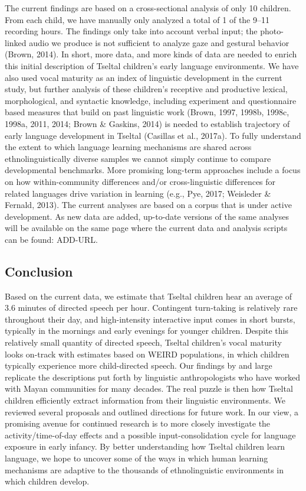 \documentclass[floatsintext,man]{apa6}
\theoremstyle{definition}
\theoremstyle{definition}
\theoremstyle{definition}
\theoremstyle{remark}
\begin{document}
The current findings are based on a cross-sectional analysis of only 10
children. From each child, we have manually only analyzed a total of 1
of the 9--11 recording hours. The findings only take into account verbal
input; the photo-linked audio we produce is not sufficient to analyze
gaze and gestural behavior (Brown, 2014). In short, more data, and more
kinds of data are needed to enrich this initial description of Tseltal
children's early language environments. We have also used vocal maturity
as an index of linguistic development in the current study, but further
analysis of these children's receptive and productive lexical,
morphological, and syntactic knowledge, including experiment and
questionnaire based measures that build on past linguistic work (Brown,
1997, 1998b, 1998c, 1998a, 2011, 2014; Brown \& Gaskins, 2014) is needed
to establish trajectory of early language development in Tseltal
(Casillas et al., 2017a). To fully understand the extent to which
language learning mechanisms are shared across ethnolinguistically
diverse samples we cannot simply continue to compare developmental
benchmarks. More promising long-term approaches include a focus on how
within-community differences and/or cross-linguistic differences for
related languages drive variation in learning (e.g., Pye, 2017;
Weisleder \& Fernald, 2013). The current analyses are based on a corpus
that is under active development. As new data are added, up-to-date
versions of the same analyses will be available on the same page where
the current data and analysis scripts can be found: ADD-URL.

\subsection{Conclusion}\label{disc-conclusion}

Based on the current data, we estimate that Tseltal children hear an
average of 3.6 minutes of directed speech per hour. Contingent
turn-taking is relatively rare throughout their day, and high-intensity
interactive input comes in short bursts, typically in the mornings and
early evenings for younger children. Despite this relatively small
quantity of directed speech, Tseltal children's vocal maturity looks
on-track with estimates based on WEIRD populations, in which children
typically experience more child-directed speech. Our findings by and
large replicate the descriptions put forth by linguistic anthropologists
who have worked with Mayan communities for many decades. The real puzzle
is then how Tseltal children efficiently extract information from their
linguistic environments. We reviewed several proposals and outlined
directions for future work. In our view, a promising avenue for
continued research is to more closely investigate the
activity/time-of-day effects and a possible input-consolidation cycle
for language exposure in early infancy. By better understanding how
Tseltal children learn language, we hope to uncover some of the ways in
which human learning mechanisms are adaptive to the thousands of
ethnolinguistic environments in which children develop.
\end{document}
